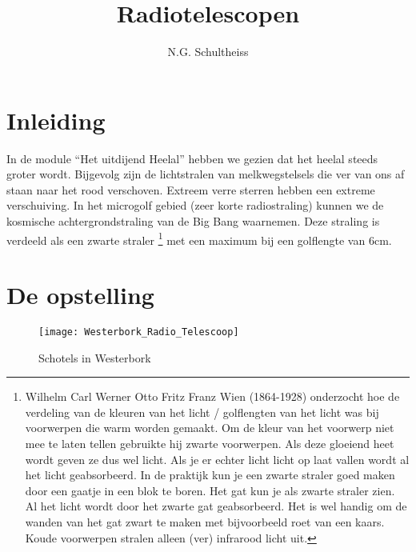 



\title{Radiotelescopen}
\author{N.G. Schultheiss}
\date{}

\maketitle
\thispagestyle{firststyle}

\section{Inleiding}

In de module ``Het uitdijend Heelal'' hebben we gezien dat het heelal
steeds groter wordt. Bijgevolg zijn de lichtstralen van melkwegstelsels
die ver van ons af staan naar het rood verschoven. Extreem verre sterren
hebben een extreme verschuiving. In het microgolf gebied (zeer korte
radiostraling) kunnen we de kosmische achtergrondstraling van de Big
Bang waarnemen. Deze straling is verdeeld als een zwarte straler
\footnote{Wilhelm Carl Werner Otto Fritz Franz Wien (1864-1928)
onderzocht hoe de verdeling van de kleuren van het licht / golflengten
van het licht was bij voorwerpen die warm worden gemaakt. Om de kleur
van het voorwerp niet mee te laten tellen gebruikte hij zwarte
voorwerpen. Als deze gloeiend heet wordt geven ze dus wel licht. Als je
er echter licht licht op laat vallen wordt al het licht geabsorbeerd. In
de praktijk kun je een zwarte straler goed maken door een gaatje in een
blok te boren. Het gat kun je als zwarte straler zien. Al het licht
wordt door het zwarte gat geabsorbeerd. Het is wel handig om de wanden
van het gat zwart te maken met bijvoorbeeld roet van een kaars. Koude
voorwerpen stralen alleen (ver) infrarood licht uit.} met een maximum
bij een golflengte van 6cm.


\section{De opstelling}

\begin{figure}[h]
\noindent \begin{centering}
\texttt{[image: Westerbork\_Radio\_Telescoop]}
\par\end{centering}

\caption{Schotels in Westerbork\cite{westerbork}}
\end{figure}


